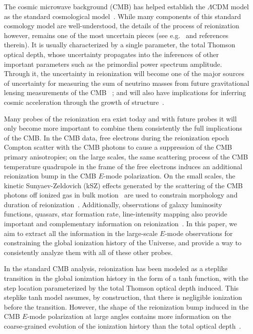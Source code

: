 \documentclass[prd,twocolumn,amsmath,amssymb,floatfix,superscriptaddress,nofootinbib]{revtex4-1}
\begin{document}
The cosmic microwave background (CMB) has helped establish the $\Lambda$CDM model as the standard cosmological model~\cite{Aghanim:2018eyx}. While many components of this standard cosmology model are well-understood, the details of the process of reionization however, remains one of the most uncertain pieces (see e.g.~\cite{2016ASSL..423.....M} and references therein).  It is usually characterized by a single parameter, the total Thomson optical depth, whose  uncertainty propagates into the inferences of other important parameters such as the primordial power spectrum amplitude. Through it, the uncertainty in reionization will become one of the major sources of uncertainty for measuring the sum of neutrino masses from future gravitational lensing measurements of the CMB~ \cite{Smith:2006nk,Allison:2015qca}; and will also have implications for inferring cosmic acceleration through the growth of structure~\cite{Hu:2003pt}. 

Many probes of  the reionization era exist today and with future probes it will only become more important to combine them consistently the full implications of the CMB. In the CMB data, free electrons during the reionization epoch Compton scatter with the CMB photons to cause a suppression of the CMB primary anisotropies; on the large scales, the same scattering process of the CMB temperature quadrupole in the frame of the free electrons induces an additional reionization bump in the CMB $E$-mode polarization. On the small scales, the kinetic Sunyaev-Zeldovich (kSZ) effects generated by the scattering of the CMB photons off ionized gas in bulk motion~\cite{zeldovich_sunyaev_1969, sunyaev_zeldovich_1980} are used to constrain morphology and duration of reionization~\cite{mcquinn_2005,mesinger_2012_kSZ}. Additionally, observations of galaxy luminosity functions, quasars, star formation rate, line-intensity mapping also provide important and complementary information on reionization~\cite{2016ASSL..423.....M}. In this paper, we aim to extract all the information in the large-scale $E$-mode observations for constraining the global ionization history of the Universe, and provide a way to consistently analyze them with all of these other probes.
 
In the standard CMB analysis, reionization has been  modeled as a steplike transition in the global ionization history in the form of a tanh function, with the step location parameterized by the total Thomson optical depth induced. This steplike tanh model assumes, by construction, that there is negligible ionization before the transition. However, the shape of the reionization bump induced in the CMB $E$-mode polarization at large angles contains more information on the coarse-grained evolution of the ionization history than the total optical depth~\cite{Hu:2003gh, Mortonson:2007hq}. 
\end{document}
